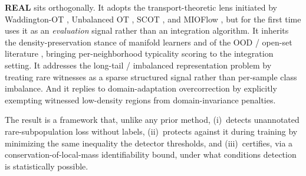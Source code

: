 \textbf{REAL} sits orthogonally. It adopts the transport-theoretic lens initiated by Waddington-OT \citep{schiebinger2019wot}, Unbalanced OT \citep{chizat2018uot}, SCOT \citep{demetci2020scot}, and MIOFlow \citep{bunne2022monge}, but for the first time uses it as an \emph{evaluation} signal rather than an integration algorithm. It inherits the density-preservation stance of manifold learners \citep{moon2019phate, moor2020topoae} and of the OOD / open-set literature \citep{bendale2016openmax, lee2018mahalanobis, liu2020energy, nalisnick2019typicality, ren2019likelihood}, bringing per-neighborhood typicality scoring to the integration setting. It addresses the long-tail / imbalanced representation problem \citep{menon2021logitadj, cui2019classbalanced} by treating rare witnesses as a sparse structured signal rather than per-sample class imbalance. And it replies to domain-adaptation overcorrection \citep{bendavid2010domain, ganin2016dann} by explicitly exempting witnessed low-density regions from domain-invariance penalties.

The result is a framework that, unlike any prior method, (i)~detects unannotated rare-subpopulation loss without labels, (ii)~protects against it during training by minimizing the same inequality the detector thresholds, and (iii)~certifies, via a conservation-of-local-mass identifiability bound, under what conditions detection is statistically possible.
